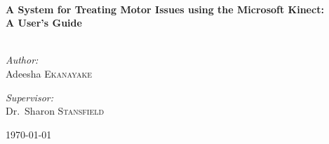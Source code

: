 
\begin{titlepage}

\begin {center}

\HRule \\ [0.4cm]
{\huge \bfseries A System for Treating Motor Issues using the Microsoft Kinect:\\[0.4cm] A User's Guide} \\[0.4cm]
\HRule \\[1.5cm]

\begin{minipage}{0.4\textwidth}
\begin{flushleft} \large
\emph{Author:}\\
Adeesha \textsc{Ekanayake}
\end{flushleft}
\end{minipage}
\begin{minipage}{0.4\textwidth}
\begin{flushright} \large
\emph{Supervisor:} \\
Dr.~Sharon \textsc{Stansfield}
\end{flushright}
\end{minipage}

\vfill

{\large \today}

\end{center}


\end{titlepage}
